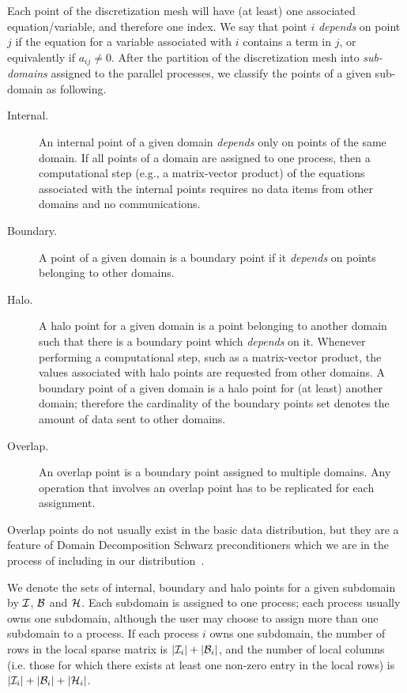 Each point of the discretization mesh will have (at least) one
associated equation/variable, and therefore one index. We say that
point  $i$ {\em depends\/} on point $j$ if the  equation for a
variable associated with $i$ contains a term in $j$,  or equivalently
if $a_{ij} \ne0$.  
After the partition of the discretization mesh into {\em sub-domains\/}
assigned to the parallel processes,
we classify the  points of a given sub-domain as following.
\begin{description}
\item[Internal.] An internal point of
 a given domain {\em depends} only on  points of the
same domain. 
If all points of a domain are assigned to one
process, then a computational step (e.g., a
matrix-vector product) of the 
equations associated with the internal points  requires no data
items from other domains and no communications.

\item[Boundary.] A point of
a given domain is a boundary point if it {\em depends} on  points
belonging to other domains.

\item[Halo.] A halo point for a given domain is a point belonging to
another domain such that there is a boundary point which {\em depends\/}
on it. Whenever performing a computational step, such as a
matrix-vector product, the values associated with halo points are
requested from other domains. A boundary point of a given 
domain is a halo point for (at least) another domain; therefore
the cardinality of the boundary points set denotes the amount of data
 sent to other domains. 
\item[Overlap.] An overlap point is a boundary point assigned to
multiple domains. Any operation that involves an overlap point
has to be replicated for each assignment. 
\end{description}
Overlap points do not usually exist in the basic data
distribution, but they are a feature of Domain Decomposition
Schwarz preconditioners which we are in the process of including in
our distribution~\cite{PARA04,APNUM06}. 

We denote the sets of  internal, boundary and halo points for a given
subdomain  by $\cal I$, $\cal B$ and $\cal H$.
Each subdomain is assigned to one process; each process usually
owns one subdomain, although the user may choose to assign more than
one subdomain to a process.  If each process $i$ owns one
subdomain, the number of rows in the local sparse matrix is
$|{\cal I}_i| + |{\cal B}_i|$, and the number of local columns
(i.e. those for which there exists at least one non-zero entry in the
local rows)  is $|{\cal I}_i| + |{\cal B}_i| +|{\cal H}_i|$.

